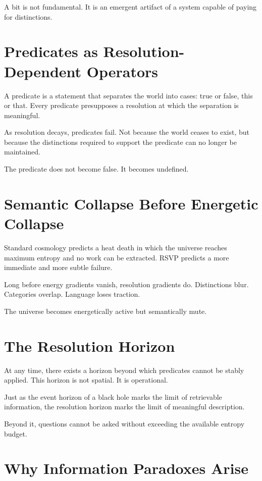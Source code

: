 \documentclass[11pt]{book}
\begin{document}
A bit is not fundamental. It is an emergent artifact of a system capable of paying for distinctions.

\section{Predicates as Resolution-Dependent Operators}

A predicate is a statement that separates the world into cases: true or false, this or that. Every predicate presupposes a resolution at which the separation is meaningful.

As resolution decays, predicates fail. Not because the world ceases to exist, but because the distinctions required to support the predicate can no longer be maintained.

The predicate does not become false. It becomes undefined.

\section{Semantic Collapse Before Energetic Collapse}

Standard cosmology predicts a heat death in which the universe reaches maximum entropy and no work can be extracted. RSVP predicts a more immediate and more subtle failure.

Long before energy gradients vanish, resolution gradients do. Distinctions blur. Categories overlap. Language loses traction.

The universe becomes energetically active but semantically mute.

\section{The Resolution Horizon}

At any time, there exists a horizon beyond which predicates cannot be stably applied. This horizon is not spatial. It is operational.

Just as the event horizon of a black hole marks the limit of retrievable information, the resolution horizon marks the limit of meaningful description.

Beyond it, questions cannot be asked without exceeding the available entropy budget.

\section{Why Information Paradoxes Arise}
\end{document}
